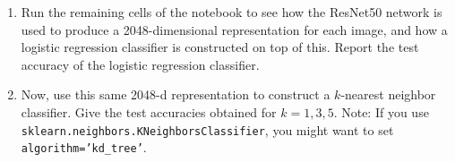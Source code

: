 \documentclass{article}
\begin{document}
\begin{enumerate}
\begin{enumerate}
        \item Run the remaining cells of the notebook to see how the ResNet50 network is used to produce a 2048-dimensional representation for each image, and how a logistic regression classifier is constructed on top of this. Report the test accuracy of the logistic regression classifier.

        \item Now, use this same 2048-d representation to construct a $k$-nearest neighbor classifier. Give the test accuracies obtained for $k=1, 3, 5$. Note: If you use \texttt{sklearn.neighbors.KNeighborsClassifier}, you might want to set \texttt{algorithm='kd\_tree'}.
    \end{enumerate}
\end{enumerate}
\end{document}
